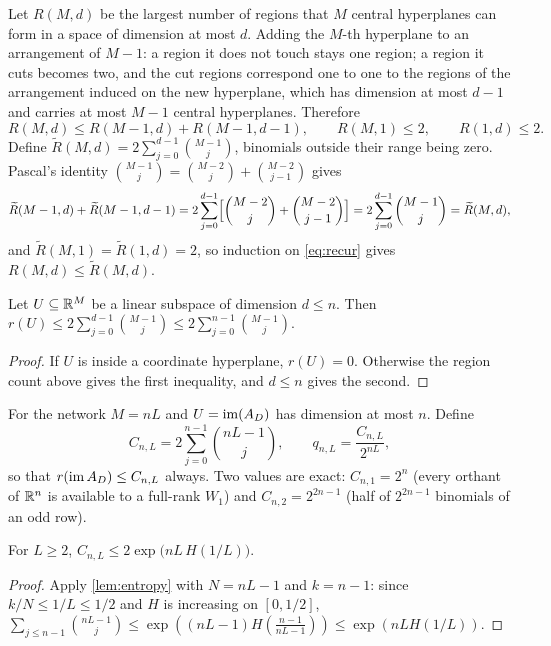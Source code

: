 Let $R(M,d)$ be the largest number of regions that $M$ central hyperplanes can form in a space of dimension at most $d$. Adding the $M$-th hyperplane to an arrangement of $M-1$: a region it does not touch stays one region; a region it cuts becomes two, and the cut regions correspond one to one to the regions of the arrangement induced on the new hyperplane, which has dimension at most $d-1$ and carries at most $M-1$ central hyperplanes. Therefore
\begin{equation}\label{eq:recur}
R(M,d)\le R(M-1,d)+R(M-1,d-1),\qquad R(M,1)\le 2,\qquad R(1,d)\le 2 .
\end{equation}
Define $\widetilde R(M,d)=2\sum_{j=0}^{d-1}\binom{M-1}{j}$, binomials outside their range being zero. Pascal's identity $\binom{M-1}{j}=\binom{M-2}{j}+\binom{M-2}{j-1}$ gives
\[
\widetilde R(M-1,d)+\widetilde R(M-1,d-1)=2\sum_{j=0}^{d-1}\Bigl[\binom{M-2}{j}+\binom{M-2}{j-1}\Bigr]=2\sum_{j=0}^{d-1}\binom{M-1}{j}=\widetilde R(M,d),
\]
and $\widetilde R(M,1)=\widetilde R(1,d)=2$, so induction on \cref{eq:recur} gives $R(M,d)\le\widetilde R(M,d)$.

\begin{lemma}\label{lem:cover}
Let $U\subseteq\mathbb{R}^M$ be a linear subspace of dimension $d\le n$. Then $r(U)\le 2\sum_{j=0}^{d-1}\binom{M-1}{j}\le 2\sum_{j=0}^{n-1}\binom{M-1}{j}$.
\end{lemma}

\begin{proof}
If $U$ is inside a coordinate hyperplane, $r(U)=0$. Otherwise the region count above gives the first inequality, and $d\le n$ gives the second.
\end{proof}

For the network $M=nL$ and $U=\operatorname{im}(A_D)$ has dimension at most $n$. Define
\begin{equation}\label{eq:CnL}
C_{n,L}=2\sum_{j=0}^{n-1}\binom{nL-1}{j},\qquad q_{n,L}=\frac{C_{n,L}}{2^{nL}},
\end{equation}
so that $r(\operatorname{im} A_D)\le C_{n,L}$ always. Two values are exact: $C_{n,1}=2^n$ (every orthant of $\mathbb{R}^n$ is available to a full-rank $W_1$) and $C_{n,2}=2^{2n-1}$ (half of $2^{2n-1}$ binomials of an odd row).

\begin{lemma}\label{lem:C-entropy}
For $L\ge 2$, $C_{n,L}\le 2\exp\bigl(nL\,H(1/L)\bigr)$.
\end{lemma}

\begin{proof}
Apply \cref{lem:entropy} with $N=nL-1$ and $k=n-1$: since $k/N\le 1/L\le 1/2$ and $H$ is increasing on $[0,1/2]$, $\sum_{j\le n-1}\binom{nL-1}{j}\le\exp((nL-1)H(\tfrac{n-1}{nL-1}))\le\exp(nLH(1/L))$.
\end{proof}


